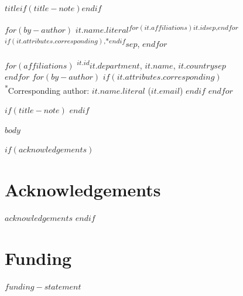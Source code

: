 \documentclass[11pt,a4paper]{article}
\begin{document}
\linenumbers

\begin{center}
{\LARGE\bfseries $title$$if(title-note)$\begingroup\renewcommand{\thefootnote}{\fnsymbol{footnote}}\footnotemark[2]\endgroup$endif$\par}
\vspace{1em}
{\large
$for(by-author)$
\mbox{$it.name.literal$\textsuperscript{$for(it.affiliations)$$it.id$$sep$,$endfor$$if(it.attributes.corresponding)$,*$endif$}}$sep$, %
$endfor$\par}
\vspace{0.75em}
{\small
$for(affiliations)$
\textsuperscript{$it.id$}$it.department$, $it.name$, $it.country$$sep$\\
$endfor$
$for(by-author)$
$if(it.attributes.corresponding)$
\\\textsuperscript{*}Corresponding author: $it.name.literal$ ($it.email$)
$endif$
$endfor$\par}
\end{center}
$if(title-note)$
\begingroup
\renewcommand{\thefootnote}{\fnsymbol{footnote}}
\endgroup
$endif$
\vspace{1em}

\begin{abstract}
$abstract$
\end{abstract}

$body$

\renewcommand{\bibsection}{\section*{\refname}\addcontentsline{toc}{section}{\refname}}




$if(acknowledgements)$
\section*{Acknowledgements}
$acknowledgements$
$endif$

\section*{Funding}
$funding-statement$
\end{document}
